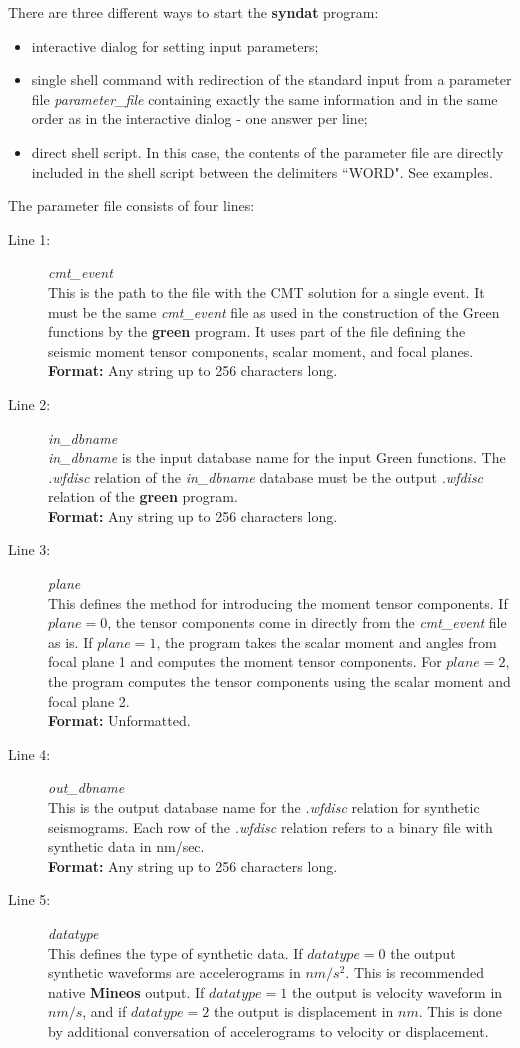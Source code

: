 \noindent There are three different ways to start the {\bf syndat} program:
\begin{itemize}
\item interactive dialog for setting input parameters;
\item single shell command with redirection of the standard input from a parameter
file {\it parameter\_file} containing exactly the same information and
in the same order as in the interactive dialog - one answer per line;
\item direct shell script. In this case, the contents of the parameter file are
directly included in the shell script between the delimiters ``WORD". See examples.
\end{itemize}
\noindent The parameter file consists of four lines:
\begin{description}
\item[Line 1:] {\it cmt\_event}\\
  This is the path to the file with the CMT solution for a single event. It must be the same
  {\it cmt\_event} file as used in the construction of the Green functions by the
 {\bf green} program. It uses part of the file
  defining the seismic moment tensor components, scalar moment, and focal planes. \\
  {\bf Format:} Any string up to 256 characters long.
\item[Line 2:] {\it in\_dbname } \\
{\it in\_dbname } is the input database name for the input Green functions. The {\it .wfdisc} relation of the
  {\it in\_dbname } database must be the output {\it .wfdisc} relation of the
  {\bf green} program. \\
  {\bf Format:} Any string up to 256 characters long. 
\item[Line 3:] {\it plane} \\
  This defines the method for introducing the moment tensor components.
  If $plane=0$, the tensor components come in directly from the {\it cmt\_event}
  file as is. If $plane=1$, the program takes the scalar moment and angles from
  focal plane 1 and computes the moment tensor components. For $plane=2$,
  the program computes the tensor components using the scalar moment and
  focal plane 2. \\
  {\bf Format:} Unformatted.
\item[Line 4:] {\it out\_dbname} \\
  This is the output database name for the {\it .wfdisc} relation for 
  synthetic seismograms. Each row of the {\it .wfdisc} relation refers to 
  a binary file with synthetic data in nm/sec. \\
  {\bf Format:} Any string up to 256 characters long.
\item[Line 5:] {\it datatype} \\
  This defines the type of synthetic data. If $datatype=0$ the 
  output synthetic waveforms are accelerograms in $nm/s^2$. This is 
  recommended native {\bf Mineos} output. If $datatype=1$ the
  output is velocity waveform in $nm/s$, and if $datatype=2$ the
  output is displacement in $nm$. This is done by additional
  conversation of accelerograms to velocity or displacement.
\end{description}
%
%
